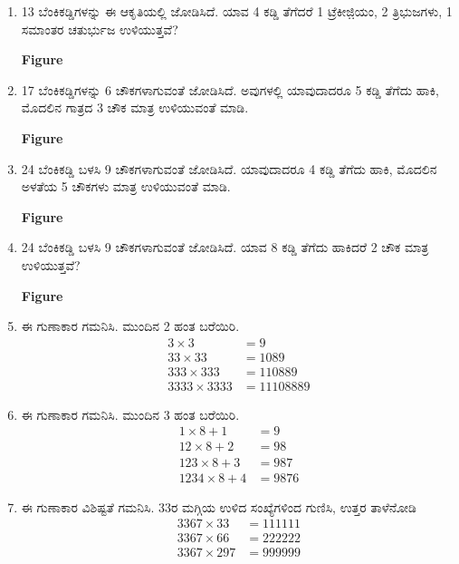 \begin{enumerate}
\item 13 ಬೆಂಕಿಕಡ್ಡಿಗಳನ್ನು ಈ ಆಕೃತಿಯಲ್ಲಿ ಜೋಡಿಸಿದೆ. ಯಾವ 4 ಕಡ್ಡಿ ತೆಗೆದರೆ 1 ಟ್ರೆಕೀಜಿ಼ಯಂ, 2 ತ್ರಿಭುಜಗಳು, 1 ಸಮಾಂತರ ಚತುರ್ಭುಜ ಉಳಿಯುತ್ತವೆ?

\begin{center}
{\bf Figure}
\end{center}

\item 17 ಬೆಂಕಿಕಡ್ಡಿಗಳನ್ನು 6 ಚೌಕಗಳಾಗುವಂತೆ ಜೋಡಿಸಿದೆ. ಅವುಗಳಲ್ಲಿ ಯಾವುದಾದರೂ 5 ಕಡ್ಡಿ ತೆಗೆದು ಹಾಕಿ, ಮೊದಲಿನ  ಗಾತ್ರದ 3 ಚೌಕ ಮಾತ್ರ ಉಳಿಯುವಂತೆ ಮಾಡಿ.

\begin{center}
{\bf Figure}
\end{center}

\item 24 ಬೆಂಕಿಕಡ್ಡಿ ಬಳಸಿ 9 ಚೌಕಗಳಾಗುವಂತೆ ಜೋಡಿಸಿದೆ. ಯಾವುದಾದರೂ 4 ಕಡ್ಡಿ ತೆಗೆದು ಹಾಕಿ, ಮೊದಲಿನ ಅಳತೆಯ 5 ಚೌಕಗಳು ಮಾತ್ರ ಉಳಿಯುವಂತೆ ಮಾಡಿ.

\begin{center}
{\bf Figure}
\end{center}

\item 24 ಬೆಂಕಿಕಡ್ಡಿ ಬಳಸಿ 9 ಚೌಕಗಳಾಗುವಂತೆ ಜೋಡಿಸಿದೆ. ಯಾವ 8 ಕಡ್ಡಿ ತೆಗೆದು ಹಾಕಿದರೆ 2 ಚೌಕ ಮಾತ್ರ ಉಳಿಯುತ್ತವೆ? 

\begin{center}
{\bf Figure}
\end{center}

\item ಈ ಗುಣಾಕಾರ ಗಮನಿಸಿ. ಮುಂದಿನ 2 ಹಂತ ಬರೆಯಿರಿ. 
\begin{align*}
3 \times 3 & = 9\\
33 \times 33 & = 1089\\
333 \times 333 & = 110889\\
3333 \times 3333 & = 11108889
\end{align*}

\item ಈ ಗುಣಾಕಾರ ಗಮನಿಸಿ. ಮುಂದಿನ 3 ಹಂತ ಬರೆಯಿರಿ. 
\begin{align*}
1 \times 8 + 1 & = 9\\
12 \times 8 + 2 & = 98\\
123 \times 8 + 3 & = 987\\
1234 \times 8 + 4 & = 9876
\end{align*}

\item ಈ ಗುಣಾಕಾರ ವಿಶಿಷ್ಟತೆ ಗಮನಿಸಿ. 33ರ ಮಗ್ಗಿಯ ಉಳಿದ ಸಂಖ್ಯೆಗಳಿಂದ ಗುಣಿಸಿ, ಉತ್ತರ ತಾಳೆನೋಡಿ 
\begin{align*}
3367 \times 33 & = 111111\\
3367 \times 66 & = 222222\\[0.2cm]
3367 \times 297 & = 999999
\end{align*}


\end{enumerate}
